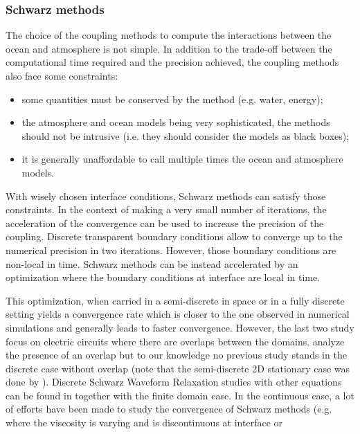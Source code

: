 \subsubsection*{Schwarz methods}
The choice of the coupling methods to compute the interactions
between the ocean and atmosphere is not simple.
In addition to the trade-off between the computational time required and
the precision achieved, the coupling methods
also face some constraints:
\begin{itemize}
	\item some quantities must be conserved by the method
		(e.g. water, energy);
	\item the atmosphere and ocean models being very
		sophisticated, the methods should not be intrusive
		(i.e. they should consider
		the models as black boxes);
	\item it is generally unaffordable to call multiple times
		the ocean and atmosphere models.
\end{itemize}
With wisely chosen interface conditions, Schwarz methods can
satisfy those constraints. In the context of making a very
small number of iterations, the acceleration of the convergence
can be used to increase the precision of the coupling.
Discrete transparent boundary conditions
\citep{zisowsky_discrete_2006} allow to converge up to the
numerical precision in two iterations.
However, those boundary conditions are non-local in time.
Schwarz methods can be instead accelerated
by an optimization \citep{gander_optimized_2006} where
the boundary conditions at interface are local in time.
\par
This optimization, when carried in a semi-discrete in space
\citep{wu_semi-discrete_2014-1} or in a fully discrete setting
\citep{wu_optimized_2017} yields a convergence rate which is
closer to the one observed in numerical simulations and
generally leads to faster convergence.
However, the last two study focus on electric circuits where
there are overlaps between the domains. \citep{gander_analysis_2018}
analyze the presence of an overlap but to our knowledge no previous study
stands in the discrete case without overlap (note that the
semi-discrete 2D stationary case was done by
\citep{gerardo-giorda_optimized_2005}).
Discrete Schwarz Waveform Relaxation studies with other equations
can be found in \citep{haynes_fully_2020} together with
the finite domain case.
In the continuous case, a lot of efforts have been made
to study the convergence of Schwarz methods
(e.g. \citep{thery_analysis_2021} where the viscosity
is varying and is discontinuous at interface or
